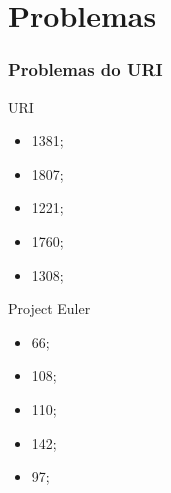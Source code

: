 \documentclass{beamer}
\begin{document}
\section{Problemas}
\begin{frame}
    \frametitle{Problemas do URI}

    \begin{minipage}{.4\textwidth}
        URI
        \begin{itemize}
            \item 1381;
            \item 1807;
            \item 1221;
            \item 1760;
            \item 1308;
        \end{itemize}
    \end{minipage}
    \begin{minipage}{.4\textwidth}
        Project Euler
        \begin{itemize}
            \item 66;
            \item 108;
            \item 110;
            \item 142;
            \item 97;
        \end{itemize}
    \end{minipage}
\end{frame}
\end{document}
